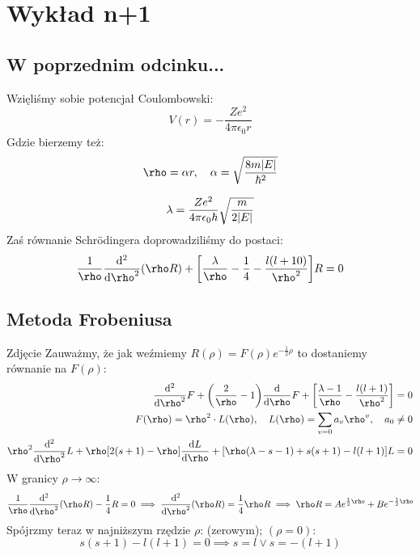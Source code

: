 \documentclass[12pt,a4paper]{report}
\newcommand{\com}[1]{{\color{red} #1}}
\newenvironment{lecture}[1]{\par\medskip
   \noindent\chapter{#1} \rmfamily}{\medskip}
\begin{document}
\begin{lecture}{Wykład n+1}
\section{W poprzednim odcinku...}
Wzięliśmy sobie potencjał Coulombowski:
\[
    V(r) = - \frac{Z e^2}{4 \pi \epsilon_0 r}
\]
Gdzie bierzemy też:
\[
    \rho = \alpha r \qc \alpha = \sqrt{\frac{8 m \abs{E}}{\hbar^2}}
\]

\[
    \lambda = \frac{Z e^2}{4 \pi \epsilon_0 \hbar} \sqrt{\frac{m}{2 \abs{E}}}
\]
Zaś równanie Schrödingera doprowadziliśmy do postaci:
\[
    \frac{1}{\rho} \dv[2]{\rho}(\rho R) + \qty[\frac{\lambda}{\rho} - \frac14 - \frac{l(l+10)}{\rho^2}]R = 0
\]

\section{Metoda Frobeniusa}


\com{Zdjęcie}
Zauważmy, że jak weźmiemy $R(\rho) = F(\rho)e^{-\frac12\rho}$ to dostaniemy równanie na $F(\rho)$:
\begin{align*}
    \dv[2]{\rho}F + \qty(\frac{2}{\rho} - 1) \dv{\rho}F + \qty[\frac{\lambda - 1}{\rho} - \frac{l(l+1)}{\rho^2}] &= 0\\
    F(\rho) = \rho^2 \cdot L(\rho) \qc L(\rho) = \sum_{v=0}a_v\rho^v\qc a_0 &\neq 0\\
    \rho^2 \dv[2]{\rho}L + \rho\qty[2(s+1) - \rho] \dv{L}{\rho} + \qty[\rho(\lambda - s - 1) + s(s+1) - l(l+1)] L &= 0
\end{align*}
W granicy $\rho \to \infty$:
\[
    \frac{1}{\rho} \dv[2]{\rho}(\rho R) - \frac14 R = 0 \implies \dv[2]{\rho} (\rho R) = \frac14 \rho R \implies \rho R = A e^{\frac12 \rho} + B e^{-\frac12 \rho}
\]
Spójrzmy teraz w najniższym rzędzie $\rho$: (zerowym); $(\rho = 0)$:
\[
    s(s+1) - l(l+1) = 0 \implies s = l \lor s = -(l+1)
\]


\end{lecture}
\end{document}

